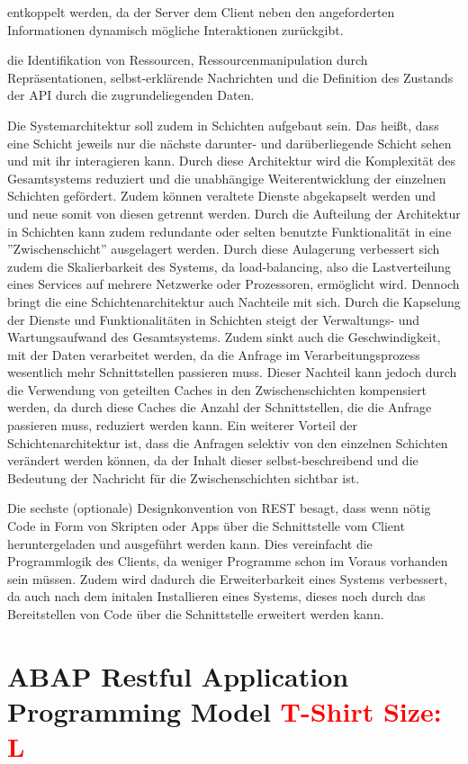 entkoppelt werden, da der Server dem Client neben den angeforderten Informationen dynamisch mögliche Interaktionen zurückgibt.

die Identifikation von Ressourcen, Ressourcenmanipulation durch Repräsentationen, selbst-erklärende Nachrichten und die Definition des Zustands der API durch die zugrundeliegenden Daten.

Die Systemarchitektur soll zudem in Schichten aufgebaut sein. Das hei{\ss}t, dass eine Schicht jeweils nur die nächste darunter- und darüberliegende Schicht sehen und mit ihr interagieren kann. Durch diese Architektur wird die Komplexität des Gesamtsystems reduziert und die unabhängige Weiterentwicklung der einzelnen Schichten gefördert. Zudem können veraltete Dienste abgekapselt werden und und neue somit von diesen getrennt werden. Durch die Aufteilung der Architektur in Schichten kann zudem redundante oder selten benutzte Funktionalität in eine ''Zwischenschicht'' ausgelagert werden. Durch diese Aulagerung verbessert sich zudem die Skalierbarkeit des Systems, da load-balancing, also die Lastverteilung eines Services auf mehrere Netzwerke oder Prozessoren, ermöglicht wird. Dennoch bringt die eine Schichtenarchitektur auch Nachteile mit sich. Durch die Kapselung der Dienste und Funktionalitäten in Schichten steigt der Verwaltungs- und Wartungsaufwand des Gesamtsystems. Zudem sinkt auch die Geschwindigkeit, mit der Daten verarbeitet werden, da die Anfrage im Verarbeitungsprozess wesentlich mehr Schnittstellen passieren muss. Dieser Nachteil kann jedoch durch die Verwendung von geteilten Caches in den Zwischenschichten kompensiert werden, da durch diese Caches die Anzahl der Schnittstellen, die die Anfrage passieren muss, reduziert werden kann. Ein weiterer Vorteil der Schichtenarchitektur ist, dass die Anfragen selektiv von den einzelnen Schichten verändert werden können, da der Inhalt dieser selbst-beschreibend und die Bedeutung der Nachricht für die Zwischenschichten sichtbar ist.

Die sechste (optionale) Designkonvention von REST besagt, dass wenn nötig Code in Form von Skripten oder Apps über die Schnittstelle vom Client heruntergeladen und ausgeführt werden kann. Dies vereinfacht die Programmlogik des Clients, da weniger Programme schon im Voraus vorhanden sein müssen. Zudem wird dadurch die Erweiterbarkeit eines Systems verbessert, da auch nach dem initalen Installieren eines Systems, dieses noch durch das Bereitstellen von Code über die Schnittstelle erweitert werden kann. 

\section{ABAP Restful Application Programming Model \textcolor{red}{T-Shirt Size: L}}

